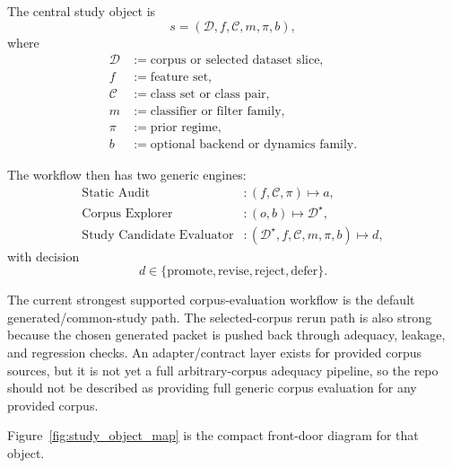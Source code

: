 \documentclass[11pt]{article}
\begin{document}
The central study object is
\begin{equation}
s = (\mathcal{D}, f, \mathcal{C}, m, \pi, b),
\end{equation}
where
\begin{align}
\mathcal{D} &:= \text{corpus or selected dataset slice}, \\
f &:= \text{feature set}, \\
\mathcal{C} &:= \text{class set or class pair}, \\
m &:= \text{classifier or filter family}, \\
\pi &:= \text{prior regime}, \\
b &:= \text{optional backend or dynamics family}.
\end{align}

The workflow then has two generic engines:
\begin{align}
\text{Static Audit} &: (f, \mathcal{C}, \pi) \mapsto a, \\
\text{Corpus Explorer} &: (o, b) \mapsto \mathcal{D}^{\star}, \\
\text{Study Candidate Evaluator} &: (\mathcal{D}^{\star}, f, \mathcal{C}, m, \pi, b) \mapsto d,
\end{align}
with decision
\begin{equation}
d \in \{\text{promote}, \text{revise}, \text{reject}, \text{defer}\}.
\end{equation}

The current strongest supported corpus-evaluation workflow is the default generated/common-study path. The selected-corpus rerun path is also strong because the chosen generated packet is pushed back through adequacy, leakage, and regression checks. An adapter/contract layer exists for provided corpus sources, but it is not yet a full arbitrary-corpus adequacy pipeline, so the repo should not be described as providing full generic corpus evaluation for any provided corpus.

Figure~\ref{fig:study_object_map} is the compact front-door diagram for that object.
\end{document}
